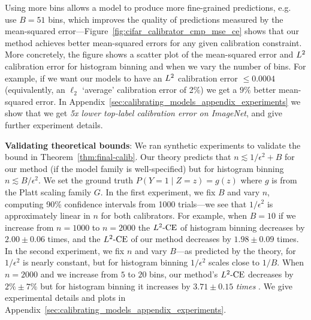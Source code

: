 Using more bins allows a model to produce more fine-grained predictions, e.g.~\cite{brocker2012empirical} use $B = 51$ bins, which improves the quality of predictions   measured by the mean-squared error---Figure~\ref{fig:cifar_calibrator_cmp_mse_ce} shows that our method achieves better mean-squared errors for any given calibration constraint.
More concretely, the figure shows a scatter plot of the mean-squared error and $L^2{}$ calibration error for histogram binning and \ourcal{} when we vary the number of bins. For example, if we want our models to have an $L^2{}$ calibration error $\leq 0.0004$ (equivalently, an $\ell_2$ `average' calibration error of 2\%) we get a $9\%$  better mean-squared error. In Appendix~\ref{sec:calibrating_models_appendix_experiments} we show that we get \emph{5x lower top-label calibration error on ImageNet}, and give further experiment details.

\textbf{Validating theoretical bounds}: We ran synthetic experiments to validate the bound in Theorem~\ref{thm:final-calib}. Our theory predicts that $n \lesssim 1/\epsilon^2 + B$  for our method (if the model family is well-specified) but for histogram binning $n \lesssim B/\epsilon^2$. We set the ground truth  $P(Y = 1 \mid Z=z) = g(z)$ where $g$ is from the Platt scaling family  $G$. In the first experiment, we fix $B$ and vary $n$, computing 90\% confidence intervals from 1000 trials---we see that $1/\epsilon^2$ is approximately linear in $n$ for both calibrators. For example, when $B=10$ if we increase from $n=1000$ to $n=2000$ the $L^2\textup{-CE}$ of histogram binning decreases by $2.00 \pm 0.06$ times, and the $L^2\textup{-CE}$ of our method decreases by $1.98 \pm 0.09$ times. In the second experiment, we fix $n$ and vary $B$---as predicted by the theory, for \ourcal{} $1/\epsilon^2$ is nearly constant, but for histogram binning $1/\epsilon^2$ scales close to $1/B$. When $n = 2000$ and we increase from $5$ to $20$ bins, our method's $L^2\textup{-CE}$ decreases by $2\% \pm 7\%$ but for histogram binning it increases by $3.71 \pm 0.15$ \emph{times} .
We give experimental details and plots in Appendix~\ref{sec:calibrating_models_appendix_experiments}.

